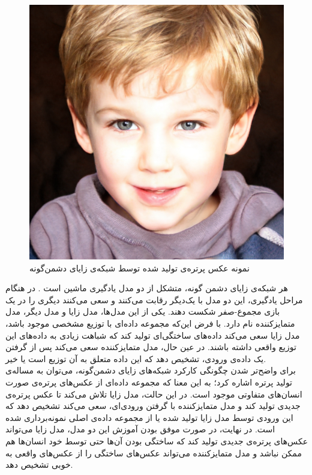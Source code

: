 \begin{figure}
	\centering
	\includegraphics[scale=0.17]{figures/fakeperson.jpg}
	\caption [
	نمونه عکس پرتره‌ی تولید شده توسط شبکه‌ی زایای دشمن‌گونه
	]{
	نمونه عکس پرتره‌ی تولید شده توسط شبکه‌ی زایای دشمن‌گونه
	\cite{thisperson}
	}
	\label{fig:lstmblock}
\end{figure}

هر شبکه‌ی زایای دشمن گونه، متشکل از دو مدل یادگیری ماشین است
\cite{goodfellow_gan}.
در هنگام مراحل یادگیری، این دو مدل با یک‌دیگر رقابت می‌کنند و سعی می‌کنند دیگری را در یک بازی مجموع-صفر شکست دهند. یکی از این مدل‌ها، مدل زایا و مدل دیگر، مدل متمایزکننده نام دارد. 
با فرض این‌که مجموعه داده‌ای با توزیع مشخصی موجود باشد، مدل زایا سعی می‌کند داده‌های ساختگی‌ای تولید کند که شباهت زیادی به داده‌های این توزیع واقعی داشته باشند. در عین حال، مدل متمایزکننده سعی می‌کند پس از گرفتن یک داده‌ی ورودی، تشخیص دهد که این داده متعلق به آن توزیع است یا خیر.
\\
برای واضح‌تر شدن چگونگی کارکرد شبکه‌های زایای دشمن‌گونه، می‌توان به مساله‌ی تولید پرتره اشاره کرد؛ به این معنا که مجموعه داده‌ای از عکس‌های پرتره‌ی صورت انسان‌های متفاوتی موجود است. در این حالت، مدل زایا تلاش می‌کند تا عکس پرتره‌ی جدیدی تولید کند و مدل متمایزکننده با گرفتن ورودی‌ای، سعی می‌کند تشخیص دهد که این ورودی توسط مدل زایا تولید شده یا از مجموعه داده‌ی اصلی نمونه‌برداری شده است.
در نهایت، در صورت موفق بودن آموزش این دو مدل، مدل زایا می‌تواند عکس‌های پرتره‌ی جدیدی تولید کند که ساختگی بودن آن‌ها حتی توسط خود انسان‌ها هم ممکن نباشد و مدل متمایزکننده می‌تواند عکس‌های ساختگی را از عکس‌های واقعی به خوبی تشخیص دهد. 
